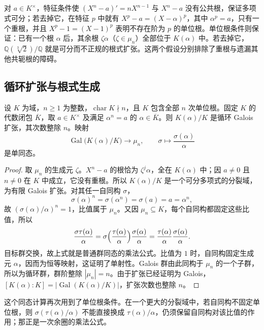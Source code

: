 \ProseParagraphBreak
对 \(a\in K^\times\)，特征条件使 \((X^n-a)'=nX^{n-1}\) 与 \(X^n-a\) 没有公共根，保证多项式可分；若去掉它，在特征 \(p\) 中就有 \(X^p-a=(X-\alpha)^p\)，其中 \(\alpha^p=a\)，只有一个重根，并且 \(X^p-1=(X-1)^p\) 表明不存在阶为 \(p\) 的单位根。单位根条件则保证：已有一个根 \(\alpha\) 后，其余根 \(\zeta\alpha\)（\(\zeta\in\mu_n\)）全部位于 \(K(\alpha)\) 中。若去掉它，\(\mathbb Q(\sqrt[3]{2})/\mathbb Q\) 就是可分而不正规的根式扩张。这两个假设分别排除了重根与遗漏其他共轭根的障碍。

\subsection{循环扩张与根式生成}
\label{b1:subsec:2003:04}

\begin{proposition}\label{b1:prop:single-radical-cyclic}
	设 \(K\) 为域，\(n\geq1\) 为整数，\(\operatorname{char}K\nmid n\)，且 \(K\) 包含全部 \(n\) 次单位根。固定 \(K\) 的代数闭包 \(\overline K\)，取 \(a\in K^\times\) 及满足 \(\alpha^n=a\) 的 \(\alpha\in\overline K\)。则 \(K(\alpha)/K\) 是循环 Galois 扩张，其次数整除 \(n\)。映射
	\[
		\operatorname{Gal}\bigl(K(\alpha)/K\bigr)\longrightarrow\mu_n, \qquad\sigma\longmapsto\frac{\sigma(\alpha)}{\alpha}
	\]
	是单同态。
\end{proposition}
\begin{proof}
	取 \(\mu_n\) 的生成元 \(\zeta\)。\(X^n-a\) 的根恰为 \(\zeta^j\alpha\)，全在 \(K(\alpha)\) 中；因 \(a\neq0\) 且 \(n\neq0\) 在 \(K\) 中成立，它没有重根。所以 \(K(\alpha)/K\) 是一个可分多项式的分裂域，为有限 Galois 扩张。对其任一自同构 \(\sigma\)，
	\[
		\sigma(\alpha)^n=\sigma(\alpha^n)=\sigma(a)=a=\alpha^n,
	\]
	故 \((\sigma(\alpha)/\alpha)^n=1\)，比值属于 \(\mu_n\)。又因 \(\mu_n\subseteq K\)，每个自同构都固定这些比值，所以
	\[
		\frac{\sigma\tau(\alpha)}{\alpha} =\sigma\Bigl(\frac{\tau(\alpha)}{\alpha}\Bigr)\frac{\sigma(\alpha)}{\alpha} =\frac{\tau(\alpha)}{\alpha}\frac{\sigma(\alpha)}{\alpha}.
	\]
	目标群交换，故上式就是普通群同态的乘法公式。比值为 \(1\) 时，自同构固定生成元 \(\alpha\)，因而为恒等映射，这证明了单射性。Galois 群由此同构于 \(\mu_n\) 的一个子群，所以为循环群，群阶整除 \(|\mu_n|=n\)。由于扩张已经证明为 Galois，\([K(\alpha):K]=|\operatorname{Gal}(K(\alpha)/K)|\)，扩张次数也整除 \(n\)。
\end{proof}

这个同态计算再次用到了单位根条件。在一个更大的分裂域中，若自同构不固定单位根，则 \(\sigma(\tau(\alpha)/\alpha)\) 不能直接换成 \(\tau(\alpha)/\alpha\)，仍须保留自同构对该比值的作用；那正是一次余圈的乘法公式。

